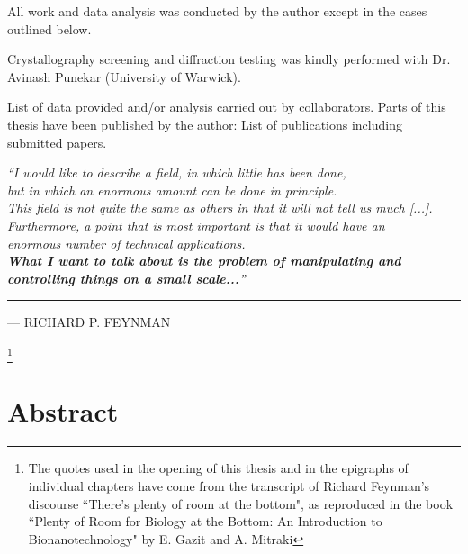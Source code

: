 \documentclass[a4paper, oneside, 11pt]{report} %
\makeatletter
\newcommand\markerlessfootnote[1]{%
  \begingroup
  \makeatletter
  \renewcommand\footnoterule{%
    \kern-3\p@
    \hrule\@width \textwidth
    \kern2/6\p@}
    \makeatother
  \renewcommand\thefootnote{}\footnote{#1}%
  \addtocounter{footnote}{-1}%
  \endgroup
}
\newlength\longest
\makeatother
\begin{document}
All work and data analysis was conducted by the author except in the cases outlined below.

Crystallography screening and diffraction testing was kindly performed with Dr. Avinash Punekar (University of Warwick).

List of data provided and/or analysis carried out by collaborators.
Parts of this thesis have been published by the author:
List of publications including submitted papers.

\newpage

\clearpage

\thispagestyle{empty}
\null\vfill

\settowidth{}
\begin{center}
\parbox{\longest}{%
 \raggedright{\large \itshape%
   ``I would like to describe a field, in which little has been done, \\
   but in which an enormous amount can be done in principle. \\[2ex]
   This field is not quite the same as others in that it will not tell us much [...]. \\
   Furthermore, a point that is most important is that it would have an \\
   enormous number of technical applications.\\[2ex]


   \large \textbf{What I want to talk about is the problem of manipulating and controlling
   things on a small scale...}'' \par\vspace{0.35cm}\hrule\bigskip
   }
   \raggedleft\Large\MakeUppercase{--- Richard P. Feynman}\par%
}
\end{center}
\vfill

\markerlessfootnote{The quotes used in the opening of this thesis and in the epigraphs of individual chapters have come from the transcript of Richard Feynman's discourse ``There's plenty of room at the bottom", as reproduced in the book ``Plenty of Room for Biology at the Bottom: An Introduction to Bionanotechnology" by E. Gazit and A. Mitraki}
\clearpage

\newpage
\chapter*{Abstract}
\lipsum[1]
\newpage
\end{document}
